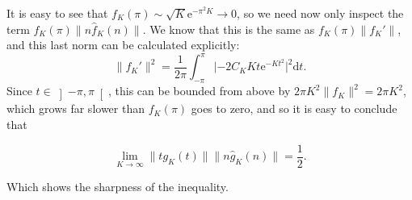 \documentclass{amsart}
\newcommand{\dd}{\mathrm{d}}
\newcommand{\e}{\mathrm{e}}
\begin{document}
It is easy to see that $f_K(\pi) \sim \sqrt K \e^{- \pi^2 K} \to 0$, so we need now only inspect the term $f_K(\pi) \lVert n \hat f_K(n) \rVert$. We know that this is the same as $f_K(\pi) \lVert f_K' \rVert$, and this last norm can be calculated explicitly:
\[\lVert f_K' \rVert^2 = \frac1{2 \pi} \int_{-\pi}^\pi \lvert - 2 C_K K t \e^{- K t^2} \rvert^2 \dd t.\]
Since $t \in \left]-\pi, \pi\right[$, this can be bounded from above by $2 \pi K^2 \lVert f_K \rVert^2 = 2 \pi K^2$, which grows far slower than $f_K(\pi)$ goes to zero, and so it is easy to conclude that

\[\lim_{K \to \infty} \lVert t g_K(t) \rVert \lVert n \hat g_K(n) \rVert = \frac12.\]

Which shows the sharpness of the inequality.


{}

\end{document}
